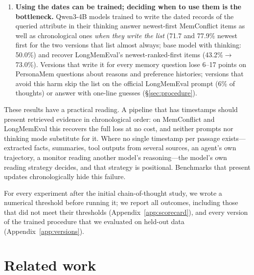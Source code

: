 \documentclass[11pt]{article}
\begin{document}
\begin{enumerate}
  \item \textbf{Using the dates can be trained; deciding when to use them is the bottleneck.} Qwen3-4B models trained to write the dated records of the queried attribute in their thinking answer newest-first MemConflict items as well as chronological ones \emph{when they write the list} (71.7 and 77.9\% newest first for the two versions that list almost always; base model with thinking: 50.0\%) and recover LongMemEval's newest-ranked-first items (43.2\%$\rightarrow$73.0\%). Versions that write it for every memory question lose 6--17 points on PersonaMem questions about reasons and preference histories; versions that avoid this harm skip the list on the official LongMemEval prompt (6\% of thoughts) or answer with one-line guesses (\S\ref{sec:procedure}).
\end{enumerate}

These results have a practical reading. A pipeline that has timestamps should present retrieved evidence in chronological order: on MemConflict and LongMemEval this recovers the full loss at no cost, and neither prompts nor thinking mode substitute for it. Where no single timestamp per passage exists---extracted facts, summaries, tool outputs from several sources, an agent's own trajectory, a monitor reading another model's reasoning---the model's own reading strategy decides, and that strategy is positional. Benchmarks that present updates chronologically hide this failure.

For every experiment after the initial chain-of-thought study, we wrote a numerical threshold before running it; we report all outcomes, including those that did not meet their thresholds (Appendix~\ref{app:scorecard}), and every version of the trained procedure that we evaluated on held-out data (Appendix~\ref{app:versions}).

\section{Related work}
\label{sec:related}
\end{document}
